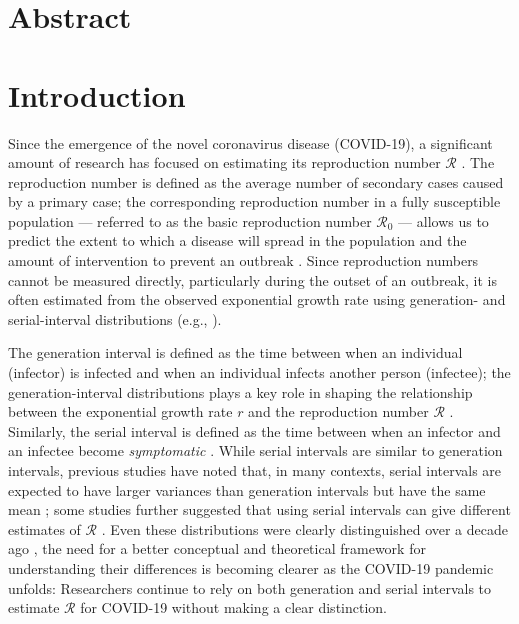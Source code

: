 \documentclass[12pt]{article}
\date{\today}
\begin{document}
\begin{flushleft}{
	\Large
	\textbf{}
}
\end{flushleft}

\section*{Abstract}

\pagebreak

\section{Introduction}

Since the emergence of the novel coronavirus disease (COVID-19), a significant amount of research has focused on estimating its reproduction number $\mathcal R$ \citep{majumder2020early}.
The reproduction number is defined as the average number of secondary cases caused by a primary case;
the corresponding reproduction number in a fully susceptible population --- referred to as the basic reproduction number $\mathcal R_0$ --- allows us to predict the extent to which a disease will spread in the population and the amount of intervention to prevent an outbreak \citep{anderson1991infectious}.
Since reproduction numbers cannot be measured directly, particularly during the outset of an outbreak, it is often estimated from the observed exponential growth rate using generation- and serial-interval distributions (e.g., \cite{du2020serial, jung2020real, li2020early, zhao2020preliminary}).

The generation interval is defined as the time between when an individual (infector) is infected and when an individual infects another person (infectee);
the generation-interval distributions plays a key role in shaping the relationship between the exponential growth rate $r$ and the reproduction number $\mathcal R$ \citep{wallinga2007generation}.
Similarly, the serial interval is defined as the time between when an infector and an infectee become \emph{symptomatic} \citep{svensson2007note}.
While serial intervals are similar to generation intervals, previous studies have noted that, in many contexts, serial intervals are expected to have larger variances than generation intervals but have the same mean \citep{svensson2007note,klinkenberg2011correlation,champredon2018equivalence};
some studies further suggested that using serial intervals can give different estimates of $\mathcal R$ \citep{britton2019estimation}.
Even these distributions were clearly distinguished over a decade ago \citep{svensson2007note}, 
the need for a better conceptual and theoretical framework for understanding their differences is becoming clearer as the COVID-19 pandemic unfolds:
Researchers continue to rely on both generation and serial intervals to estimate $\mathcal R$ for COVID-19 without making a clear distinction.
\end{document}
